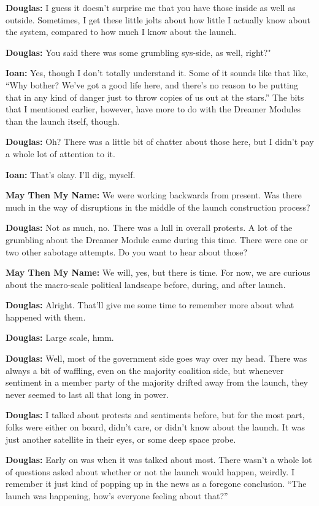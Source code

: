 \textbf{Douglas:} I guess it doesn't surprise me that you have those inside as well as outside. Sometimes, I get these little jolts about how little I actually know about the system, compared to how much I know about the launch.

\textbf{Douglas:} You said there was some grumbling sys-side, as well, right?"

\textbf{Ioan:} Yes, though I don't totally understand it. Some of it sounds like that like, ``Why bother? We've got a good life here, and there's no reason to be putting that in any kind of danger just to throw copies of us out at the stars.'' The bits that I mentioned earlier, however, have more to do with the Dreamer Modules than the launch itself, though.

\textbf{Douglas:} Oh? There was a little bit of chatter about those here, but I didn't pay a whole lot of attention to it.

\textbf{Ioan:} That's okay. I'll dig, myself.

\textbf{May Then My Name:} We were working backwards from present. Was there much in the way of disruptions in the middle of the launch construction process?

\textbf{Douglas:} Not as much, no. There was a lull in overall protests. A lot of the grumbling about the Dreamer Module came during this time. There were one or two other sabotage attempts. Do you want to hear about those?

\textbf{May Then My Name:} We will, yes, but there is time. For now, we are curious about the macro-scale political landscape before, during, and after launch.

\textbf{Douglas:} Alright. That'll give me some time to remember more about what happened with them.

\textbf{Douglas:} Large scale, hmm.

\textbf{Douglas:} Well, most of the government side goes way over my head. There was always a bit of waffling, even on the majority coalition side, but whenever sentiment in a member party of the majority drifted away from the launch, they never seemed to last all that long in power.

\textbf{Douglas:} I talked about protests and sentiments before, but for the most part, folks were either on board, didn't care, or didn't know about the launch. It was just another satellite in their eyes, or some deep space probe.

\textbf{Douglas:} Early on was when it was talked about most. There wasn't a whole lot of questions asked about whether or not the launch would happen, weirdly. I remember it just kind of popping up in the news as a foregone conclusion. ``The launch was happening, how's everyone feeling about that?''

